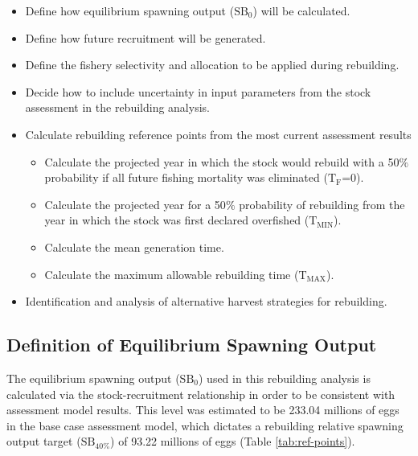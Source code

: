 \documentclass[11pt,
  english,
  a4paper,
]{article}
\begin{document}
\begin{itemize}
    \item Define how equilibrium spawning output ($\text{SB}_0$) will be calculated. 
    \item Define how future recruitment will be generated. 
    \item Define the fishery selectivity and allocation to be applied during rebuilding. 
    \item Decide how to include uncertainty in input parameters from the stock assessment in the rebuilding analysis. 
    \item Calculate rebuilding reference points from the most current assessment results 
    \begin{itemize}
        \item Calculate the projected year in which the stock would rebuild with a 50$\%$ probability if all future fishing mortality was eliminated ($\text{T}_\text{F}$=0).
        \item  Calculate the projected year for a 50$\%$ probability of rebuilding from the year in which the stock was first declared overfished ($\text{T}_\text{MIN}$). 
        \item Calculate the mean generation time. 
        \item Calculate the maximum allowable rebuilding time ($\text{T}_\text{MAX}$). 
    \end{itemize}
    \item Identification and analysis of alternative harvest strategies for rebuilding. 
\end{itemize}


\hypertarget{definition-of-equilibrium-spawning-output}{%
\subsection{Definition of Equilibrium Spawning Output}\label{definition-of-equilibrium-spawning-output}}

\leavevmode\tagmcend\tagstructend


The equilibrium spawning output ({\(\text{SB}_0\)\leavevmode\tagmcend\tagstructend}) used in this rebuilding analysis is calculated via the stock-recruitment relationship in order to be consistent with assessment model results. This level was estimated to be 233.04 millions of eggs in the base case assessment model, which dictates a rebuilding relative spawning output target ({\(\text{SB}_{40\%}\)\leavevmode\tagmcend\tagstructend}) of 93.22 millions of eggs (Table \ref{tab:ref-points}).
\end{document}
